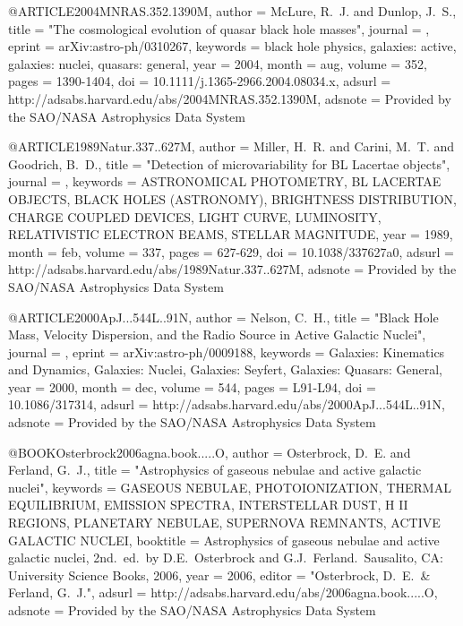 \documentclass[twocolumn]{aastex62}
\begin{document}
{{{@ARTICLE{2004MNRAS.352.1390M,
   author = {{McLure}, R.~J. and {Dunlop}, J.~S.},
    title = "{The cosmological evolution of quasar black hole masses}",
  journal = {\mnras},
   eprint = {arXiv:astro-ph/0310267},
 keywords = {black hole physics, galaxies: active, galaxies: nuclei, quasars: general},
     year = 2004,
    month = aug,
   volume = 352,
    pages = {1390-1404},
      doi = {10.1111/j.1365-2966.2004.08034.x},
   adsurl = {http://adsabs.harvard.edu/abs/2004MNRAS.352.1390M},
  adsnote = {Provided by the SAO/NASA Astrophysics Data System}
}



@ARTICLE{1989Natur.337..627M,
   author = {{Miller}, H.~R. and {Carini}, M.~T. and {Goodrich}, B.~D.},
    title = "{Detection of microvariability for BL Lacertae objects}",
  journal = {\nat},
 keywords = {ASTRONOMICAL PHOTOMETRY, BL LACERTAE OBJECTS, BLACK HOLES (ASTRONOMY), BRIGHTNESS DISTRIBUTION, CHARGE COUPLED DEVICES, LIGHT CURVE, LUMINOSITY, RELATIVISTIC ELECTRON BEAMS, STELLAR MAGNITUDE},
     year = 1989,
    month = feb,
   volume = 337,
    pages = {627-629},
      doi = {10.1038/337627a0},
   adsurl = {http://adsabs.harvard.edu/abs/1989Natur.337..627M},
  adsnote = {Provided by the SAO/NASA Astrophysics Data System}
}


@ARTICLE{2000ApJ...544L..91N,
   author = {{Nelson}, C.~H.},
    title = "{Black Hole Mass, Velocity Dispersion, and the Radio Source in Active Galactic Nuclei}",
  journal = {\apjl},
   eprint = {arXiv:astro-ph/0009188},
 keywords = {Galaxies: Kinematics and Dynamics, Galaxies: Nuclei, Galaxies: Seyfert, Galaxies: Quasars: General},
     year = 2000,
    month = dec,
   volume = 544,
    pages = {L91-L94},
      doi = {10.1086/317314},
   adsurl = {http://adsabs.harvard.edu/abs/2000ApJ...544L..91N},
  adsnote = {Provided by the SAO/NASA Astrophysics Data System}
}


@BOOK{Osterbrock2006agna.book.....O,
   author = {{Osterbrock}, D.~E. and {Ferland}, G.~J.},
    title = "{Astrophysics of gaseous nebulae and active galactic nuclei}",
 keywords = {GASEOUS NEBULAE, PHOTOIONIZATION, THERMAL EQUILIBRIUM, EMISSION SPECTRA, INTERSTELLAR DUST, H II REGIONS, PLANETARY NEBULAE, SUPERNOVA REMNANTS, ACTIVE GALACTIC NUCLEI},
booktitle = {Astrophysics of gaseous nebulae and active galactic nuclei, 2nd.~ed.~by D.E.~Osterbrock and G.J.~Ferland.~Sausalito, CA: University Science Books, 2006},
     year = 2006,
   editor = "{Osterbrock, D.~E.~\& Ferland, G.~J.}",
   adsurl = {http://adsabs.harvard.edu/abs/2006agna.book.....O},
  adsnote = {Provided by the SAO/NASA Astrophysics Data System}
}



}}}
\end{document}

